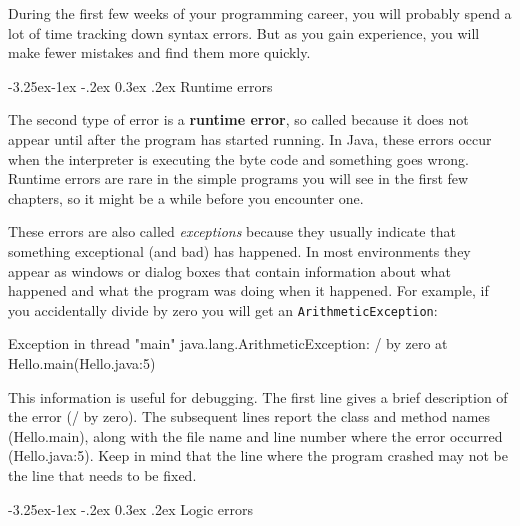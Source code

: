 \documentclass[12pt]{book}
\makeatletter
\theoremstyle{exercise}
\newcommand{\java}[1]{\verb"#1"}
\renewcommand\subsection{\@startsection{subsection}{2}{\z@}%
    {-3.25ex\@plus -1ex \@minus -.2ex}%
    {0.3ex \@plus .2ex}%
    {\normalfont\large\bfseries}}
\newcommand{\java}[1]{\lstinline{#1}} %
\makeatother
\begin{document}
During the first few weeks of your programming career, you will probably spend a lot of time tracking down syntax errors.
But as you gain experience, you will make fewer mistakes and find them more quickly.

\subsection{Runtime errors}


The second type of error is a {\bf runtime error}, so called because it does not appear until after the program has started running.
In Java, these errors occur when the interpreter is executing the byte code and something goes wrong.
Runtime errors are rare in the simple programs you will see in the first few chapters, so it might be a while before you encounter one.


These errors are also called {\em exceptions} because they usually indicate that something exceptional (and bad) has happened.
In most environments they appear as windows or dialog boxes that contain information about what happened and what the program was doing when it happened.
For example, if you accidentally divide by zero you will get an \java{ArithmeticException}:

\begin{small}
\begin{stdout}
Exception in thread "main" java.lang.ArithmeticException: / by zero
    at Hello.main(Hello.java:5)
\end{stdout}
\end{small}

This information is useful for debugging.
The first line gives a brief description of the error (/ by zero).
The subsequent lines report the class and method names (Hello.main), along with the file name and line number where the error occurred (Hello.java:5).
Keep in mind that the line where the program crashed may not be the line that needs to be fixed.

\subsection{Logic errors}
\end{document}
